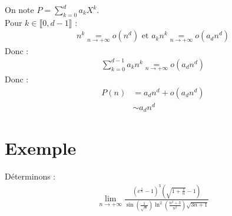 \documentclass[../main.tex]{subfiles}
\begin{document}
\noindent On note $P = \sum\limits_{k=0}^d a_k X^k$. \\
Pour $k\in \llbracket 0, d-1 \rrbracket$ : 
\begin{align*}
    n^k \underset{n\to +\infty}{=} o(n^d) \text{ et } a_k n^k \underset{n\to +\infty}{=} o(a_d n^d)
\end{align*}
Donc :
\begin{align*}
    \sum_{k=0}^{d-1} a_k n^k \underset{n\to +\infty}{=} o(a_d n^d)
\end{align*}
Donc : 
\begin{align*}
    P(n) &= a_d n^d + o(a_d n^d) \\
    &\sim a_d n^d
\end{align*}

\section{Exemple}
\begin{tcolorbox}[title=Exemple 24.31, title filled=false, colframe=darkgreen, colback=darkgreen!10!white]
    Déterminons : 
    \begin{align*}
        \lim_{n\to +\infty} \frac{\left(e^{\frac{1}{n}}-1\right)^3 \left(\sqrt{1+\frac{1}{n}}-1\right)}{\sin\left(\frac{1}{\sqrt{n}}\right)\ln^2\left(\frac{n^2+3}{n^2}\right)\sqrt{3n+1}} 
    \end{align*}
\end{tcolorbox}
\end{document}
